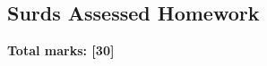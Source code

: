 \documentclass[../c1]{subfiles}
\begin{document}
\subsection*{Surds Assessed Homework}
\thispagestyle{fancy}



\begin{flushright}
\textbf{Total marks: [30]}
\end{flushright}
\end{document}
